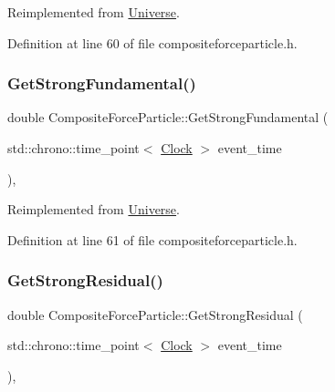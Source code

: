 Reimplemented from \hyperlink{class_universe_acb453ce71da418c5b5617fecede9571b}{Universe}.



Definition at line 60 of file compositeforceparticle.\+h.

\mbox{\label{class_composite_force_particle_abc8597f3b4f7cf755ab4618bd624b046}} 
\subsubsection{\texorpdfstring{Get\+Strong\+Fundamental()}{GetStrongFundamental()}}
{\footnotesize\ttfamily double Composite\+Force\+Particle\+::\+Get\+Strong\+Fundamental (\begin{DoxyParamCaption}\item[{std\+::chrono\+::time\+\_\+point$<$ \hyperlink{universe_8h_a0ef8d951d1ca5ab3cfaf7ab4c7a6fd80}{Clock} $>$}]{event\+\_\+time }\end{DoxyParamCaption})\hspace{0.3cm}{\ttfamily [inline]}, {\ttfamily [virtual]}}



Reimplemented from \hyperlink{class_universe_ab44daccba01ee7e3cf9b50bba83dd19e}{Universe}.



Definition at line 61 of file compositeforceparticle.\+h.

\mbox{\label{class_composite_force_particle_a24214566eb5b44340d5563b6583052e8}} 
\subsubsection{\texorpdfstring{Get\+Strong\+Residual()}{GetStrongResidual()}}
{\footnotesize\ttfamily double Composite\+Force\+Particle\+::\+Get\+Strong\+Residual (\begin{DoxyParamCaption}\item[{std\+::chrono\+::time\+\_\+point$<$ \hyperlink{universe_8h_a0ef8d951d1ca5ab3cfaf7ab4c7a6fd80}{Clock} $>$}]{event\+\_\+time }\end{DoxyParamCaption})\hspace{0.3cm}{\ttfamily [inline]}, {\ttfamily [virtual]}}



